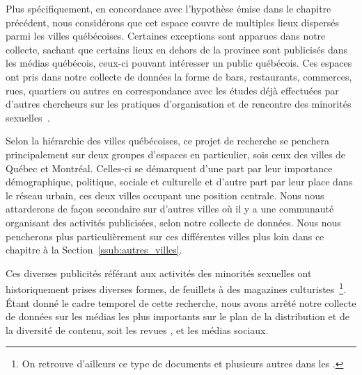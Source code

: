 Plus spécifiquement, en concordance avec l'hypothèse émise dans le chapitre précédent, nous considérons que cet espace couvre de multiples lieux dispersés parmi les villes québécoises.
Certaines exceptions sont apparues dans notre collecte, sachant que certains lieux en dehors de la province sont publicisés dans les médias québécois, ceux-ci pouvant intéresser un public québécois.
Ces espaces ont pris dans notre collecte de données la forme de bars, restaurants, commerces, rues, quartiers ou autres en correspondance avec les études déjà effectuées par d'autres chercheurs sur les pratiques d'organisation et de rencontre des minorités sexuelles~\citep{Higgins1999,Hinrichs2012}.

Selon la hiérarchie des villes québécoises, ce projet de recherche se penchera principalement sur deux groupes d'espaces en particulier, sois ceux des villes de Québec et Montréal.
Celles-ci se démarquent d'une part par leur importance démographique, politique, sociale et culturelle et d'autre part par leur place dans le réseau urbain, ces deux villes occupant une position centrale.
Nous nous attarderons de façon secondaire sur d'autres villes où il y a une communauté \lgbt{} organisant des activités publicisées, selon notre collecte de données.
Nous nous pencherons plus particulièrement sur ces différentes villes plus loin dans ce chapitre à la Section~\ref{ssub:autres_villes}.

Ces diverses publicités référant aux activités des minorités sexuelles ont historiquement prises diverses formes, de feuillets à des magazines culturistes~\citep{Higgins1999}\footnote{On retrouve d'ailleurs ce type de documents et plusieurs autres dans les \agq{}.}.
Étant donné le cadre temporel de cette recherche, nous avons arrêté notre collecte de données sur les médias les plus importants sur le plan de la distribution et de la diversité de contenu, soit les revues \fugues{}, \sortie{} et les médias sociaux.

